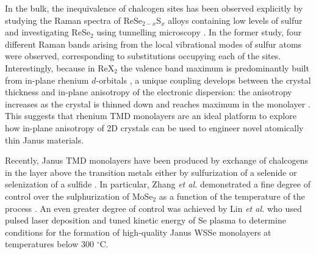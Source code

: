 \documentclass[reprint, superscriptaddress, amsmath,amssymb,prb,twocolumn]{revtex4-2}
\begin{document}
In the bulk, the inequivalence of chalcogen sites has been observed explicitly by studying the Raman spectra of ReSe$_{2-x}$S$_{x}$ alloys containing low levels of sulfur \cite{hart_npj2d_2017} and investigating ReSe$_{2}$ using tunnelling microscopy \cite{hong_acsnano_2018}. In the former study, four different Raman bands arising from the local vibrational modes of sulfur atoms were observed, corresponding to substitutions occupying each of the sites. Interestingly, because in ReX$_2$ the valence band maximum is predominantly built from in-plane rhenium $d$-orbitals \cite{kertesz_jacs_1984, choi_acsnano_2020}, a unique coupling develops between the crystal thickness and in-plane anisotropy of the electronic dispersion: the anisotropy increases as the crystal is thinned down and reaches maximum in the monolayer \cite{hart_prb_2021}. This suggests that rhenium TMD monolayers are an ideal platform to explore how in-plane anisotropy of 2D crystals can be used to engineer novel atomically thin Janus materials.  

Recently, Janus TMD monolayers have been produced by exchange of chalcogens in the layer above the transition metals either by sulfurization of a selenide \cite{zhang_acsnano_2017} or selenization of a sulfide \cite{lu_natnano_2017}. In particular, Zhang {\it{et al.}} demonstrated a fine degree of control over the sulphurization of MoSe$_2$ as a function of the temperature of the process \cite{zhang_acsnano_2017}. An even greater degree of control was achieved by Lin {\it{et al.}} who used pulsed laser deposition \cite{lin_acsnano_2020} and tuned kinetic energy of Se plasma to determine conditions for the formation of high-quality Janus WSSe monolayers at temperatures below 300 $^{\circ}$C.
\end{document}
